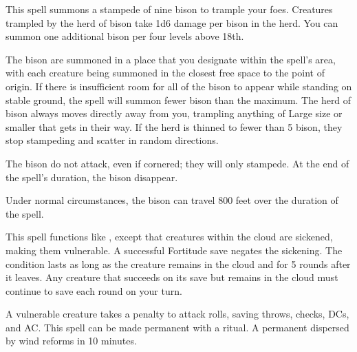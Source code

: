 \spellrng{\rngfar}
\begin{spelleffect}
  This spell summons a stampede of nine bison to trample your foes. Creatures trampled by the herd of bison take 1d6 damage per bison in the herd. You can summon one additional bison per four levels above 18th.
  \par The bison are summoned in a place that you designate within the spell's area, with each creature being summoned in the closest free space to the point of origin. If there is insufficient room for all of the bison to appear while standing on stable ground, the spell will summon fewer bison than the maximum. The herd of bison always moves directly away from you, trampling anything of Large size or smaller that gets in their way. If the herd is thinned to fewer than 5 bison, they stop stampeding and scatter in random directions.
  \par The bison do not attack, even if cornered; they will only stampede. At the end of the spell's duration, the bison disappear.
\end{spelleffect}
\begin{spellnotes}
  Under normal circumstances, the bison can travel 800 feet over the duration of the spell.
\end{spellnotes}

\begin{spelleffect}
  This spell functions like , except that creatures within the cloud are sickened, making them vulnerable. A successful Fortitude save negates the sickening. The condition lasts as long as the creature remains in the cloud and for 5 rounds after it leaves. Any creature that succeeds on its save but remains in the cloud must continue to save each round on your turn.
\end{spelleffect}
\begin{spellnotes}
  A vulnerable creature takes a  penalty to attack rolls, saving throws, checks, DCs, and AC. This spell can be made permanent with a  ritual. A permanent  dispersed by wind reforms in 10 minutes.
\end{spellnotes}

